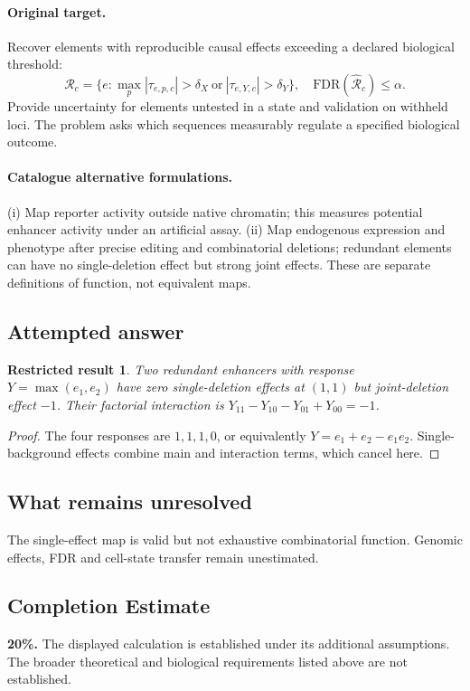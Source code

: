 \documentclass[11pt]{article}
\newtheorem{attemptresult}{Restricted result}[section]
\begin{document}
\paragraph{Original target.}
Recover elements with reproducible causal effects exceeding a declared biological threshold:
\[
\mathcal R_c=\{e:\max_p|\tau_{e,p,c}|>\delta_X\ \text{or}\ |\tau_{e,Y,c}|>\delta_Y\},
\quad \mathrm{FDR}(\widehat{\mathcal R}_c)\leq\alpha.
\]
Provide uncertainty for elements untested in a state and validation on withheld loci. The problem asks which sequences measurably regulate a specified biological outcome.
\paragraph{Catalogue alternative formulations.}
(i) Map reporter activity outside native chromatin; this measures potential enhancer activity under an artificial assay. (ii) Map endogenous expression and phenotype after precise editing and combinatorial deletions; redundant elements can have no single-deletion effect but strong joint effects. These are separate definitions of function, not equivalent maps.
\subsection{Attempted answer}
\begin{attemptresult}
Two redundant enhancers with response $Y=\max(e_1,e_2)$ have zero single-deletion effects at $(1,1)$ but joint-deletion effect $-1$. Their factorial interaction is $Y_{11}-Y_{10}-Y_{01}+Y_{00}=-1$.
\end{attemptresult}
\begin{proof}
The four responses are $1,1,1,0$, or equivalently $Y=e_1+e_2-e_1e_2$. Single-background effects combine main and interaction terms, which cancel here.
\end{proof}
\subsection{What remains unresolved}
The single-effect map is valid but not exhaustive combinatorial function. Genomic effects, FDR and cell-state transfer remain unestimated.
\subsection{Completion Estimate}
\textbf{20\%.} The displayed calculation is established under its additional assumptions. The broader theoretical and biological requirements listed above are not established.
\end{document}
